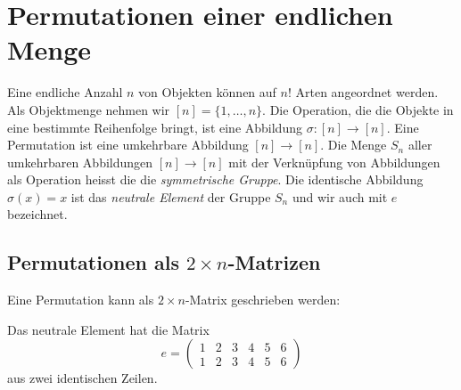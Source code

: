 %
%
%
\section{Permutationen einer endlichen Menge
\label{buch:section:permutationen-einer-endlichen-menge}}
Eine endliche Anzahl $n$ von Objekten können auf $n!$ Arten angeordnet
werden.
Als Objektmenge nehmen wir $[n] = \{ 1,\dots,n\}$.
Die Operation, die die Objekte in eine bestimmte Reihenfolge bringt,
ist eine Abbildung $\sigma\colon[n]\to[n]$.
Eine Permutation ist eine umkehrbare Abbildung $[n]\to[n]$.
Die Menge $S_n$ aller umkehrbaren Abbildungen $[n]\to[n]$
mit der Verknüpfung von Abbildungen als Operation heisst die
die {\em symmetrische Gruppe}.
Die identische Abbildung $\sigma(x)=x$ ist das {\em neutrale
Element} der Gruppe $S_n$ und wir auch mit $e$ bezeichnet.

\subsection{Permutationen als $2\times n$-Matrizen}
Eine Permutation kann als $2\times n$-Matrix geschrieben werden:
\begin{center}
\end{center}
Das neutrale Element hat die Matrix
\[
e = \begin{pmatrix}
1&2&3&4&5&6\\
1&2&3&4&5&6
\end{pmatrix}
\]
aus zwei identischen Zeilen.

